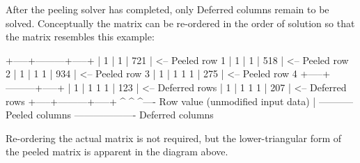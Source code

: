 After the peeling solver has completed, only Deferred columns remain to be solved. Conceptually the matrix can be re-\/ordered in the order of solution so that the matrix resembles this example\+: \begin{DoxyVerb}+-----+---------+-----+
|   1 | 1       | 721 | <-- Peeled row 1
| 1   |   1     | 518 | <-- Peeled row 2
| 1   | 1   1   | 934 | <-- Peeled row 3
|   1 | 1   1 1 | 275 | <-- Peeled row 4
+-----+---------+-----+
| 1   | 1 1   1 | 123 | <-- Deferred rows
|   1 |   1 1 1 | 207 | <-- Deferred rows
+-----+---------+-----+
    ^       ^       ^---- Row value (unmodified input data)
    |       \------------ Peeled columns
    \-------------------- Deferred columns
\end{DoxyVerb}


Re-\/ordering the actual matrix is not required, but the lower-\/triangular form of the peeled matrix is apparent in the diagram above. 